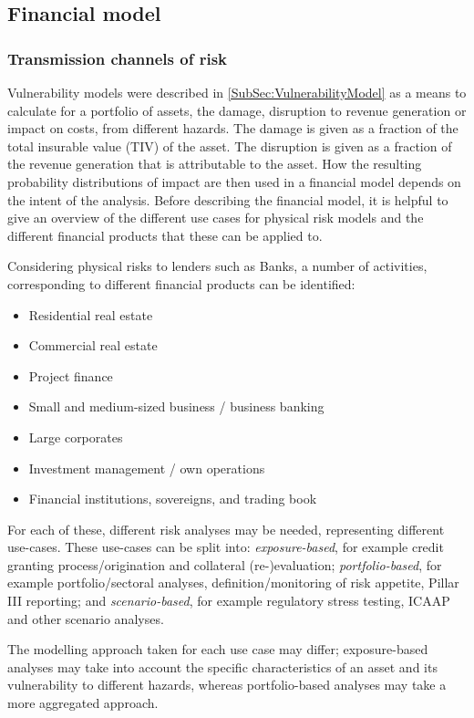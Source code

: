 \documentclass[a4paper,11pt]{extarticle} %
\theoremstyle{definition}
\begin{document}
\subsection{Financial model}

\subsubsection{Transmission channels of risk}
Vulnerability models were described in \ref{SubSec:VulnerabilityModel} as a means to calculate for a portfolio of assets, the damage, disruption to revenue generation or impact on costs, from different hazards. The damage is given as a fraction of the total insurable value (TIV) of the asset. The disruption is given as a fraction of the revenue generation that is attributable to the asset. How the resulting probability distributions of impact are then used in a financial model depends on the intent of the analysis. Before describing the financial model, it is helpful to give an overview of the different use cases for physical risk models and the different financial products that these can be applied to.

Considering physical risks to lenders such as Banks, a number of activities, corresponding to different financial products can be identified:
\begin{itemize}
\item Residential real estate
\item Commercial real estate
\item Project finance
\item Small and medium-sized business / business banking
\item Large corporates
\item Investment management / own operations
\item Financial institutions, sovereigns, and trading book
\end{itemize}

For each of these, different risk analyses may be needed, representing different use-cases. These use-cases can be split into: \emph{exposure-based}, for example credit granting process/origination and collateral (re-)evaluation; \emph{portfolio-based}, for example portfolio/sectoral analyses, definition/monitoring of risk appetite, Pillar III reporting; and \emph{scenario-based}, for example regulatory stress testing, ICAAP and other scenario analyses.

The modelling approach taken for each use case may differ; exposure-based analyses may take into account the specific characteristics of an asset and its vulnerability to different hazards, whereas portfolio-based analyses may take a more aggregated approach.
\end{document}
